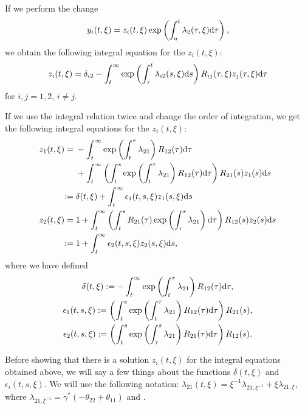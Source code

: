 If we perform the change
\begin{equation*}
 y_i(t,\xi)=z_i(t,\xi)\exp \left(\int_{a}^{t}\lambda_2(\tau,\xi){\rm d}\tau \right),
\end{equation*}
we obtain the following integral equation for the $z_i(t,\xi)$:
\begin{gather}
 z_i(t,\xi)=\delta_{i2} - \int_{t}^{\infty}\exp \left(\int_{\tau}^{t}\lambda_{i2}(s,\xi){\rm d}s\right)R_{ij}(\tau,\xi)z_j(\tau,\xi){\rm d}\tau
\label{IE2}
\end{gather}
for $i,j=1,2$, $i\neq j$.

If we use the integral relation twice and change the order of integration, we get the following integral equations for the $z_i(t,\xi)$:
\begin{align}
 z_1(t,\xi)={}&-\int_{t}^{\infty}\exp \left(\int_{t}^{\tau}\lambda_{21}\right)R_{12}(\tau){\rm d}\tau\nonumber\\
 &+ \int_{t}^{\infty}\left(\int_{t}^{s}\exp \left(\int_{t}^{\tau}\lambda_{21}\right)R_{12}(\tau){\rm d}\tau \right) R_{21}(s)z_1(s){\rm d}s\nonumber\\
:={}& \delta(t,\xi) + \int_{t}^{\infty}\epsilon_1(t,s,\xi)z_1(s,\xi){\rm d}s\nonumber\\
 z_2(t,\xi)={}& 1 + \int_{t}^{\infty}\left(\int_{t}^{s}R_{21}(\tau)\exp \left(\int_{\tau}^{s}\lambda_{21} \right){\rm d}\tau \right)R_{12}(s)z_2(s){\rm d}s\nonumber\\
:={}& 1 + \int_{t}^{\infty}\epsilon_2(t,s,\xi)z_2(s,\xi){\rm d}s,\label{IE3}
\end{align}
where we have defined
\begin{gather*}
 \delta(t,\xi):= -\int_{t}^{\infty}\exp \left(\int_{t}^{\tau}\lambda_{21}\right)R_{12}(\tau){\rm d}\tau,\\
 \epsilon_1(t,s,\xi):= \left(\int_{t}^{s}\exp \left(\int_{t}^{\tau}\lambda_{21}\right)R_{12}(\tau){\rm d}\tau \right) R_{21}(s),\\
 \epsilon_2(t,s,\xi):= \left(\int_{t}^{s}\exp \left(\int_{\tau}^{s}\lambda_{21} \right)R_{21}(\tau){\rm d}\tau \right)R_{12}(s).
\end{gather*}

Before showing that there is a solution $z_i(t,\xi)$ for the integral equations obtained above, we will say a few things about the functions $\delta(t,\xi)$ and $\epsilon_i(t,s,\xi)$. We will use the following notation: $\lambda_{21}(t,\xi)=\xi^{-1}\lambda_{21,\xi^{-1}}+\xi\lambda_{21,\xi}$, where $\lambda_{21,\xi^{-1}}=\gamma^*(-\theta_{22}+\theta_{11})$ and .


